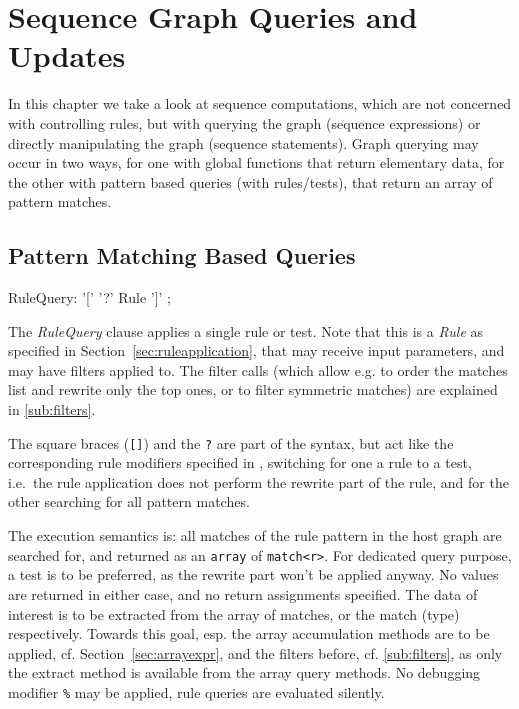 \chapter{Sequence Graph Queries and Updates}\label{cha:graphquery}%

In this chapter we take a look at sequence computations, which are not concerned with controlling rules, but with querying the graph (sequence expressions) or directly manipulating the graph (sequence statements).
Graph querying may occur in two ways, for one with global functions that return elementary data, for the other with pattern based queries (with rules/tests), that return an array of pattern matches.

\section{Pattern Matching Based Queries}\label{sec:patternbasedgraphquery}

\begin{rail}
  RuleQuery: '[' '?' Rule ']' ;
\end{rail}

The \emph{RuleQuery} clause applies a single rule or test.
Note that this is a \emph{Rule} as specified in Section~\ref{sec:ruleapplication}, that may receive input parameters, and may have filters applied to.
The filter calls (which allow e.g. to order the matches list and rewrite only the top ones, or to filter symmetric matches) are explained in \ref{sub:filters}.

The square braces (\texttt{[]}) and the \texttt{?} are part of the syntax, but act like the corresponding rule modifiers specified in \label{sec:ruleapplication}, switching for one a rule to a test, i.e.\ the rule application does not perform the rewrite part of the rule, and for the other searching for all pattern matches.

The execution semantics is: all matches of the rule pattern in the host graph are searched for, and returned as an \texttt{array} of \texttt{match<r>}.
For dedicated query purpose, a test is to be preferred, as the rewrite part won't be applied anyway. 
No values are returned in either case, and no return assignments specified.
The data of interest is to be extracted from the array of matches, or the match (type) respectively.
Towards this goal, esp. the array accumulation methods are to be applied, cf. Section~\ref{sec:arrayexpr}, and the filters before, cf. \ref{sub:filters}, as only the extract method is available from the array query methods.
No debugging modifier \texttt{\%} may be applied, rule queries are evaluated silently.

